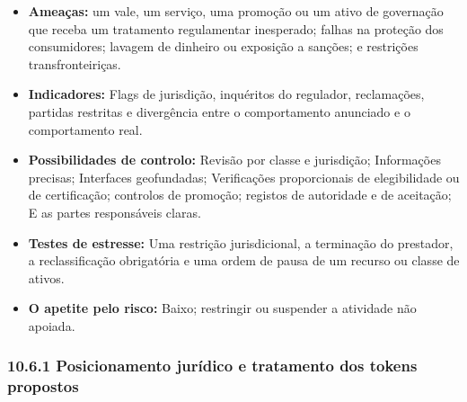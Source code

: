 \documentclass[11pt]{article}
\begin{document}
\begin{itemize}[leftmargin=*]
\item \textbf{Ameaças:} um vale, um serviço, uma promoção ou um ativo de governação que receba um tratamento regulamentar inesperado; falhas na proteção dos consumidores; lavagem de dinheiro ou exposição a sanções; e restrições transfronteiriças.
\item \textbf{Indicadores:} Flags de jurisdição, inquéritos do regulador, reclamações, partidas restritas e divergência entre o comportamento anunciado e o comportamento real.
\item \textbf{Possibilidades de controlo:} Revisão por classe e jurisdição; Informações precisas; Interfaces geofundadas; Verificações proporcionais de elegibilidade ou de certificação; controlos de promoção; registos de autoridade e de aceitação; E as partes responsáveis claras.
\item \textbf{Testes de estresse:} Uma restrição jurisdicional, a terminação do prestador, a reclassificação obrigatória e uma ordem de pausa de um recurso ou classe de ativos.
\item \textbf{O apetite pelo risco:} Baixo; restringir ou suspender a atividade não apoiada.
\end{itemize}
\subsubsection*{10.6.1 Posicionamento jurídico e tratamento dos tokens propostos}
\end{document}
